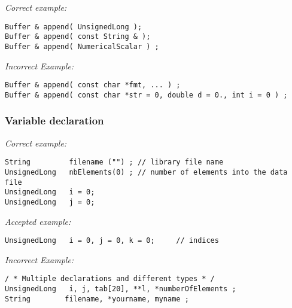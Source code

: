 
\emph{Correct example:}
\begin{lstlisting}[frame=TBRL]
Buffer & append( UnsignedLong );
Buffer & append( const String & );
Buffer & append( NumericalScalar ) ;
\end{lstlisting}
\emph{Incorrect Example:}
\begin{lstlisting}[frame=TBRL]
Buffer & append( const char *fmt, ... ) ;
Buffer & append( const char *str = 0, double d = 0., int i = 0 ) ;
\end{lstlisting}


\subsubsection{Variable declaration}

\emph{Correct example:}
\begin{lstlisting}[frame=TBRL]
String         filename ("") ; // library file name
UnsignedLong   nbElements(0) ; // number of elements into the data file
UnsignedLong   i = 0;
UnsignedLong   j = 0;
\end{lstlisting}
\emph{Accepted example:}
\begin{lstlisting}[frame=TBRL]
UnsignedLong   i = 0, j = 0, k = 0;     // indices
\end{lstlisting}
\emph{Incorrect Example:}
\begin{lstlisting}[frame=TBRL]
/ * Multiple declarations and different types * /
UnsignedLong   i, j, tab[20], **l, *numberOfElements ;
String        filename, *yourname, myname ;
\end{lstlisting}

